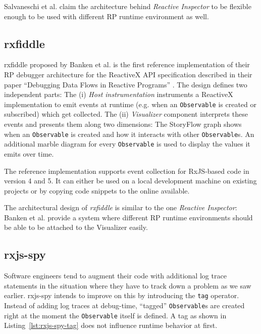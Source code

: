 \documentclass[12pt,a4paper]{article}
\begin{document}
Salvaneschi et al. claim\cite{10.1145/2577080.2577083} the architecture behind \emph{Reactive Inspector} to be flexible enough to be used with different RP runtime environment as well.

\subsection{rxfiddle}

rxfiddle proposed by Banken et al. is the first reference implementation of their RP debugger architecture for the ReactiveX API specification described in their paper ``Debugging Data Flows in Reactive Programs'' \cite{10.1145/3180155.3180156}. The design defines two independent parts: The (i) \emph{Host instrumentation} instruments a ReactiveX implementation to emit events at runtime (e.g. when an \texttt{Observable} is created or subscribed) which get collected. The (ii) \emph{Visualizer} component interprets these events and presents them along two dimensions: The StoryFlow graph \cite{YWu2013a} shows when an \texttt{Observable} is created and how it interacts with other \texttt{Observable}s. An additional marble diagram for every \texttt{Observable} is used to display the values it emits over time.

The reference implementation supports event collection for RxJS-based code in version 4 and 5. It can either be used on a local development machine on existing projects or by copying code snippets to the online available.

The architectural design of \emph{rxfiddle} is similar to the one \emph{Reactive Inspector}: Banken et al. provide a system where different RP runtime environments should be able to be attached to the Visualizer easily.


\subsection{rxjs-spy}

Software engineers tend to augment their code with additional log trace statements in the situation where they have to track down a problem as we saw earlier. rxjs-spy\cite{rxjsspy} intends to improve on this by introducing the \texttt{tag} operator. Instead of adding log traces at debug-time, ``tagged'' \texttt{Observable}s are created right at the moment the \texttt{Observable} itself is defined. A tag as shown in Listing~\ref{lst:rxjs-spy-tag} does not influence runtime behavior at first.
\end{document}
